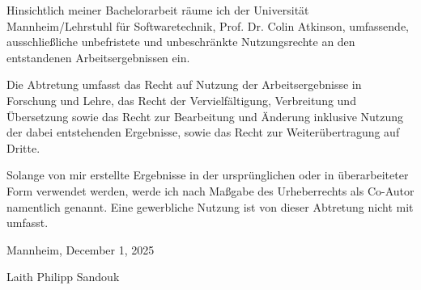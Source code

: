 \begin{appendices}
\vspace{-0.3cm}

\hrulefill

\vspace{-0.2cm} 
Hinsichtlich meiner Bachelorarbeit räume ich der Universität Mannheim/Lehrstuhl für Softwaretechnik,
Prof. Dr. Colin Atkinson, umfassende, ausschließliche unbefristete und
unbeschränkte Nutzungsrechte an den entstandenen Arbeitsergebnissen ein.

Die Abtretung umfasst das Recht auf Nutzung der Arbeitsergebnisse in Forschung
und Lehre, das Recht der Vervielfältigung, Verbreitung und Übersetzung sowie
das Recht zur Bearbeitung und Änderung inklusive Nutzung der dabei
entstehenden Ergebnisse, sowie das Recht zur Weiterübertragung auf Dritte.

Solange von mir erstellte Ergebnisse in der ursprünglichen oder in
überarbeiteter Form verwendet werden, werde ich nach Maßgabe des Urheberrechts
als Co-Autor namentlich genannt. Eine gewerbliche Nutzung ist von dieser
Abtretung nicht mit umfasst.
\bigskip

\vspace{1.0cm}

Mannheim, December 1, 2025

\vspace{1.5cm}

Laith Philipp Sandouk

\end{appendices}
